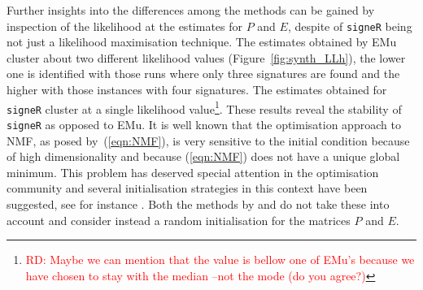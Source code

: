 \documentclass{bioinfo}
\begin{document}
Further insights into the differences among the methods can be gained
by inspection of the likelihood at the estimates for $P$ and $E$,
despite of \texttt{signeR} being not just a likelihood maximisation
technique. The estimates obtained by EMu cluster about two different
likelihood values (Figure~\ref{fig:synth_LLh}), the lower one is
identified with those runs where only three signatures are found and
the higher with those instances with four signatures. The estimates
obtained for \texttt{signeR} cluster at a single likelihood
value\footnote{\textcolor{red}{RD: Maybe we can mention that the value
is bellow one of EMu's because we have chosen to stay with the median
--not the mode (do you agree?)}}. These results reveal the stability
of \texttt{signeR} as opposed to EMu. It is well known that
the optimisation approach to NMF, as posed by~(\ref{eqn:NMF}), is
very sensitive to the initial condition because of high
dimensionality and because (\ref{eqn:NMF}) does not have a
unique global minimum. This problem has deserved special attention in
the optimisation community and several initialisation
strategies in this context have been suggested, see for instance
\cite{BBLPP, BG, LNACDarXiv}. Both the methods by \cite{FICMV} 
and \cite{A} do not take these into account and consider instead a
random initialisation for the matrices $P$ and $E$.
\end{document}
